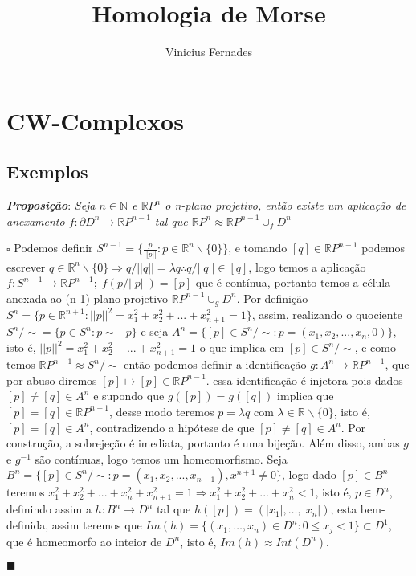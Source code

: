 \documentclass[12pt]{book}
\newcommand{\real}[1]{\mathbb{R}^{#1}}
\newcommand{\realprojetivo}[1]{\mathbb{R}P^{#1}}
\newcommand{\tese}[3]{\vspace{2mm} \textit{\textbf{#1}}: \textit{#2} \par $\square$ #3 \par $\blacksquare$}
\begin{document}
	
	\title{Homologia de Morse}
	
	\author{Vinicius Fernades}
	
	\maketitle
	
	\chapter{CW-Complexos}
	\section{Exemplos}
	\tese{Proposição}{Seja $n \in \mathbb{N}$ e $\realprojetivo{n}$ o n-plano projetivo, então existe um aplicação de anexamento $f: \partial{D^{n}} \to \realprojetivo{n-1}$ tal que $\realprojetivo{n} \approx \realprojetivo{n-1} \cup_{f} D^{n}$}{Podemos definir $S^{n-1} =\{\frac{p}{||p||}: p  \in \real{n}\backslash\{0\}\}$, e tomando $[q] \in \realprojetivo{n-1}$ podemos escrever $q \in \real{n}\backslash\{0\} \Rightarrow q/||q|| = \lambda q \therefore q/||q|| \in [q]$, logo temos a aplicação  $f:S^{n-1} \to \realprojetivo{n-1}; \; f(p/||p||) = [p]$ que é contínua, portanto temos a célula anexada ao (n-1)-plano projetivo $\realprojetivo{n-1}\cup_{g}D^{n}$. Por definição $S^{n} = \{p \in \real{n+1}: ||p||^{2} = x_{1}^{2}+x_{2}^{2}+...+x_{n+1}^{2}=1\}$, assim, realizando o quociente $S^{n}/\sim = \{p \in S^{n}: p \sim -p\}$ e seja $A^{n} = \{[p] \in S^{n}/\sim:  p = (x_{1},x_{2},...,x_{n}, 0)\}$, isto é, $||p||^{2} = x_{1}^{2}+x_{2}^{2}+...+x_{n+1}^{2}=1$ o que implica em $[p] \in S^{n}/\sim$, e como temos $\realprojetivo{n-1} \approx S^{n}/\sim $ então podemos definir a identificação $g:A^{n} \to \realprojetivo{n-1}$, que por abuso diremos $[p] \longmapsto [p] \in \realprojetivo{n-1}$. essa identificação é injetora pois dados $[p] \neq [q] \in A^{n}$ e supondo que $g([p]) = g([q])$ implica que $[p] = [q] \in \realprojetivo{n-1}$, desse modo teremos $p = \lambda q$ com $\lambda \in \real{}\backslash\{0\}$, isto é, $[p]=[q] \in A^{n}$, contradizendo a hipótese de que $[p]\neq[q] \in A^{n}$. Por construção, a sobrejeção é imediata, portanto é uma bijeção. Além disso, ambas $g$ e $g^{-1}$ são contínuas, logo temos um homeomorfismo. Seja $B^{n} = \{[p] \in S^{n}/\sim:  p = (x_{1},x_{2},..., x_{n+1}), x^{n+1} \neq 0\}$, logo dado $[p] \in B^{n}$ teremos $x_{1}^{2}+x_{2}^{2}+...+x_{n}^{2}+x_{n+1}^{2}=1 \Rightarrow x_{1}^{2}+x_{2}^{2}+...+x_{n}^{2} < 1$, isto é, $p \in D^{n}$, definindo assim a $h : B^{n} \to D^{n}$ tal que $h([p]) = (|x_{1}|,\dots, |x_{n}|)$, esta bem-definida, assim teremos que $Im(h) = \{(x_{1},\dots, x_{n}) \in D^{n}: 0 \leq x_{j} < 1 \} \subset D^{1}$, que é homeomorfo ao inteior de $D^{n}$, isto é, $Im(h) \approx Int(D^{n})$. }
	
\end{document}
